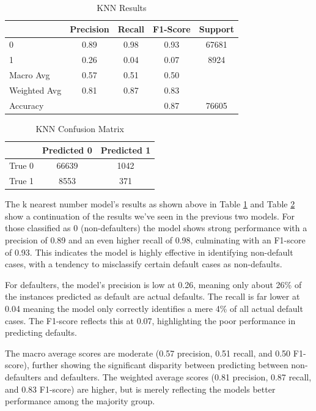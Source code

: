 \documentclass[12pt]{article}
\begin{document}
\begin{table}[htbp]
    \centering
    \caption{KNN Results}
    \begin{tabular}{lcccc}
        \toprule
        & Precision & Recall & F1-Score & Support \\
        \midrule
        0 & 0.89 & 0.98 & 0.93 & 67681 \\
        1 & 0.26 & 0.04 & 0.07 & 8924 \\
        Macro Avg & 0.57 & 0.51 & 0.50 & \\
        Weighted Avg & 0.81 & 0.87 & 0.83 & \\
        \midrule
        Accuracy & & & 0.87 & 76605 \\
        \bottomrule
    \end{tabular}
    \label{table:kNNResults}
\end{table}

\begin{table}[htbp]
    \centering
    \caption{KNN Confusion Matrix}
    \begin{tabular}{lcc}
        \toprule
        & Predicted 0 & Predicted 1 \\
        \midrule
        True 0 & 66639 & 1042 \\
        True 1 & 8553 & 371 \\
        \bottomrule
    \end{tabular}
    \label{table:kNNConfusionMatrix}
\end{table}

The k nearest number model's results as shown above in Table \ref{table:kNNResults} and Table \ref{table:kNNConfusionMatrix} show a continuation of the results we've seen in the previous two models. For those classified as 0 (non-defaulters) the model shows strong performance with a precision of 0.89 and an even higher recall of 0.98, culminating with an F1-score of 0.93. This indicates the model is highly effective in identifying non-default cases, with a tendency to misclassify certain default cases as non-defaults.

For defaulters, the model's precision is low at 0.26, meaning only about 26\% of the instances predicted as default are actual defaults. The recall is far lower at 0.04 meaning the model only correctly identifies a mere 4\% of all actual default cases. The F1-score reflects this at 0.07, highlighting the poor performance in predicting defaults.

The macro average scores are moderate (0.57 precision, 0.51 recall, and 0.50 F1-score), further showing the significant disparity between predicting between non-defaulters and defaulters. The weighted average scores (0.81 precision, 0.87 recall, and 0.83 F1-score) are higher, but is merely reflecting the models better performance among the majority group.
\end{document}
